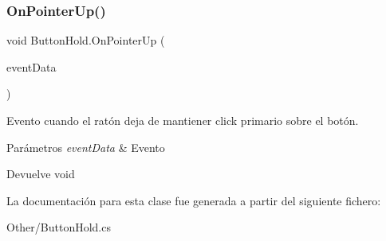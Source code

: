 \subsubsection{\texorpdfstring{OnPointerUp()}{OnPointerUp()}}
{\footnotesize\ttfamily void Button\+Hold.\+On\+Pointer\+Up (\begin{DoxyParamCaption}\item[{Pointer\+Event\+Data}]{event\+Data }\end{DoxyParamCaption})\hspace{0.3cm}{\ttfamily [inline]}}

Evento cuando el ratón deja de mantiener click primario sobre el botón. 
\begin{DoxyParams}{Parámetros}
{\em event\+Data} & Evento \\
\hline
\end{DoxyParams}
\begin{DoxyReturn}{Devuelve}
void 
\end{DoxyReturn}


La documentación para esta clase fue generada a partir del siguiente fichero\+:\begin{DoxyCompactItemize}
\item 
Other/Button\+Hold.\+cs\end{DoxyCompactItemize}
